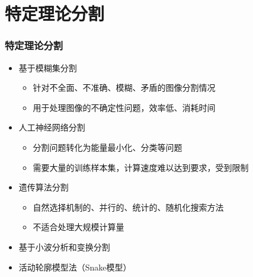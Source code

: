 \documentclass[notheorems,mathserif,table,compress]{beamer}  %
\begin{document}
\section{特定理论分割}
\begin{frame}
  \frametitle{特定理论分割}
  \begin{itemize}
  \item 基于模糊集分割
       \begin{itemize}
       \item 针对不全面、不准确、模糊、矛盾的图像分割情况
       \item 用于处理图像的不确定性问题，效率低、消耗时间
       \end{itemize}
  \item 人工神经网络分割
       \begin{itemize}
       \item 分割问题转化为能量最小化、分类等问题
       \item 需要大量的训练样本集，计算速度难以达到要求，受到限制
       \end{itemize}
  \item 遗传算法分割
       \begin{itemize}
       \item 自然选择机制的、并行的、统计的、随机化搜索方法
       \item 不适合处理大规模计算量
       \end{itemize}
  \item 基于小波分析和变换分割
  \item 活动轮廓模型法（Snake模型）
  \end{itemize}
\end{frame}
\end{document}
